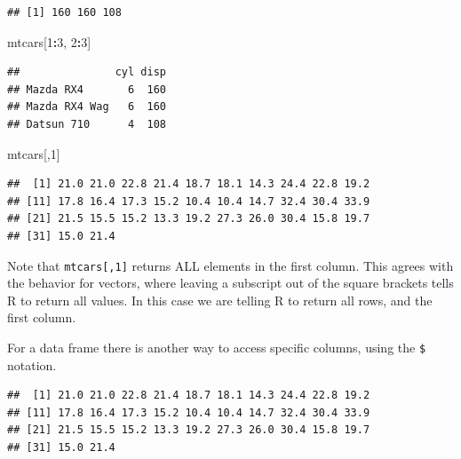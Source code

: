 \documentclass[
]{krantz}
\newenvironment{Shaded}{\begin{snugshade}}{\end{snugshade}}
\newcommand{\DecValTok}[1]{\textcolor[rgb]{0.00,0.00,0.81}{#1}}
\newcommand{\NormalTok}[1]{#1}
\newcommand{\OperatorTok}[1]{\textcolor[rgb]{0.81,0.36,0.00}{\textbf{#1}}}
\newcommand{\StringTok}[1]{\textcolor[rgb]{0.31,0.60,0.02}{#1}}
\begin{document}
\begin{verbatim}
## [1] 160 160 108
\end{verbatim}

\begin{Shaded}
\begin{Highlighting}[]
\NormalTok{mtcars[}\DecValTok{1}\OperatorTok{:}\DecValTok{3}\NormalTok{, }\DecValTok{2}\OperatorTok{:}\DecValTok{3}\NormalTok{]}
\end{Highlighting}
\end{Shaded}

\begin{verbatim}
##               cyl disp
## Mazda RX4       6  160
## Mazda RX4 Wag   6  160
## Datsun 710      4  108
\end{verbatim}

\begin{Shaded}
\begin{Highlighting}[]
\NormalTok{mtcars[,}\DecValTok{1}\NormalTok{]}
\end{Highlighting}
\end{Shaded}

\begin{verbatim}
##  [1] 21.0 21.0 22.8 21.4 18.7 18.1 14.3 24.4 22.8 19.2
## [11] 17.8 16.4 17.3 15.2 10.4 10.4 14.7 32.4 30.4 33.9
## [21] 21.5 15.5 15.2 13.3 19.2 27.3 26.0 30.4 15.8 19.7
## [31] 15.0 21.4
\end{verbatim}

Note that \texttt{mtcars{[},1{]}} returns ALL elements in the first column. This agrees with the behavior for vectors, where leaving a subscript out of the square brackets tells R to return all values. In this case we are telling R to return all rows, and the first column.

For a data frame there is another way to access specific columns, using the \texttt{\$} notation.

\begin{Shaded}
\end{Shaded}

\begin{verbatim}
##  [1] 21.0 21.0 22.8 21.4 18.7 18.1 14.3 24.4 22.8 19.2
## [11] 17.8 16.4 17.3 15.2 10.4 10.4 14.7 32.4 30.4 33.9
## [21] 21.5 15.5 15.2 13.3 19.2 27.3 26.0 30.4 15.8 19.7
## [31] 15.0 21.4
\end{verbatim}
\end{document}
